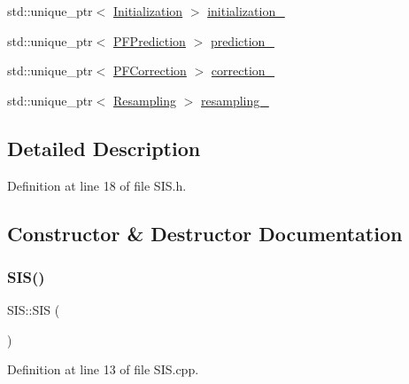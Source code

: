 \begin{DoxyCompactItemize}
std\+::unique\+\_\+ptr$<$ \mbox{\hyperlink{classbfl_1_1Initialization}{Initialization}} $>$ \mbox{\hyperlink{classbfl_1_1ParticleFilter_a5aff690b4287811912a62548188a0dda}{initialization\+\_\+}}
\item 
std\+::unique\+\_\+ptr$<$ \mbox{\hyperlink{classbfl_1_1PFPrediction}{P\+F\+Prediction}} $>$ \mbox{\hyperlink{classbfl_1_1ParticleFilter_ab86f707d29a823423fe35de37e8f9d8e}{prediction\+\_\+}}
\item 
std\+::unique\+\_\+ptr$<$ \mbox{\hyperlink{classbfl_1_1PFCorrection}{P\+F\+Correction}} $>$ \mbox{\hyperlink{classbfl_1_1ParticleFilter_a691428357c812ba009e995175778c173}{correction\+\_\+}}
\item 
std\+::unique\+\_\+ptr$<$ \mbox{\hyperlink{classbfl_1_1Resampling}{Resampling}} $>$ \mbox{\hyperlink{classbfl_1_1ParticleFilter_a9b0b855942fa4fb847443b10fe26c589}{resampling\+\_\+}}
\end{DoxyCompactItemize}


\subsection{Detailed Description}


Definition at line 18 of file S\+I\+S.\+h.



\subsection{Constructor \& Destructor Documentation}
\mbox{\label{classbfl_1_1SIS_a65cd523b660bd8f41e112841aaf45c0d}} 
\subsubsection{\texorpdfstring{S\+I\+S()}{SIS()}\hspace{0.1cm}{\footnotesize\ttfamily [1/2]}}
{\footnotesize\ttfamily S\+I\+S\+::\+S\+IS (\begin{DoxyParamCaption}{ }\end{DoxyParamCaption})\hspace{0.3cm}{\ttfamily [noexcept]}}



Definition at line 13 of file S\+I\+S.\+cpp.

\mbox{\label{classbfl_1_1SIS_af66e323d22b28f497152f2e3a65290ff}} 
